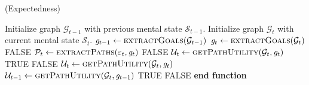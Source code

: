 \documentclass{article}
\begin{document}
\begin{algorithm}
	\caption{(Expectedness)}
	\label{array-sum}
	\begin{algorithmic}[1]
			\Statex
			\State Initialize graph $\mathcal{G}_{t-1}$ with previous mental state
			$\mathcal{S}_{t-1}$.
			\State Initialize graph $\mathcal{G}_{t}$ with current mental state
			$\mathcal{S}_{t}$.
			\Statex
			\State $\mathit{g}_{t-1} \gets \Call{extractGoals}{\mathcal{G}_{t-1}}$
			\State $\mathit{g}_{t} \gets \Call{extractGoals}{\mathcal{G}_{t}}$
			\Statex
					\State \Return FALSE
				\Else
					\State $\mathcal{P}_{t} \gets \Call{extractPaths}{\varepsilon_t,
					\mathit{g}_{t}}$
						\State \Return FALSE
					\Else
						\State $\mathcal{U}_{t} \gets
						\Call{getPathUtility}{\mathcal{G}_{t}, \mathit{g}_{t}}$
							\State \Return TRUE
						\Else
							\State \Return FALSE
						\EndIf
					\EndIf
				\EndIf
			\Else
				\State $\mathcal{U}_{t} \gets
						\Call{getPathUtility}{\mathcal{G}_{t}, \mathit{g}_{t}}$
				\State $\mathcal{U}_{t-1} \gets \Call{getPathUtility}{\mathcal{G}_{t},
						\mathit{g}_{t-1}}$
					\State \Return TRUE
				\Else
					\State \Return FALSE
				\EndIf
			\EndIf
		\EndFunction
		\State \textbf{end function}
	\end{algorithmic}
\end{algorithm}

\pagebreak
\end{document}
